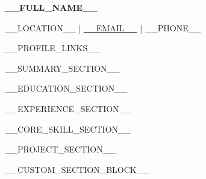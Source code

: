 \documentclass[10pt,letterpaper]{article}
\newcommand{\ResumeHeader}[4]{%
  {\fontsize{20}{24}\selectfont\bfseries\color{Primary} #1}\par
  \vspace{2pt}
  {\small\color{MutedText} #2 \quad | \quad #3 \quad | \quad #4}\par
}
\begin{document}
\color{BodyText}


\ResumeHeader{__FULL_NAME__}{__LOCATION__}{\href{mailto:__EMAIL__}{__EMAIL__}}{__PHONE__}
__PROFILE_LINKS__

\vspace{0.5\baselineskip}
__SUMMARY_SECTION__

\vspace{0.5\baselineskip}
__EDUCATION_SECTION__

\vspace{0.5\baselineskip}
__EXPERIENCE_SECTION__

\vspace{0.5\baselineskip}
__CORE_SKILL_SECTION__

\vspace{0.5\baselineskip}
__PROJECT_SECTION__

\vspace{0.5\baselineskip}
__CUSTOM_SECTION_BLOCK__
\end{document}
